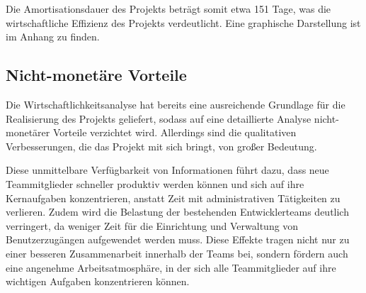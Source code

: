 Die Amortisationsdauer des Projekts beträgt somit etwa 151 Tage, was die wirtschaftliche Effizienz des Projekts verdeutlicht. Eine graphische Darstellung ist im Anhang  zu finden.

\subsection{Nicht-monetäre Vorteile}
\label{sec:Nutzwertanalyse}

Die Wirtschaftlichkeitsanalyse hat bereits eine ausreichende Grundlage für die Realisierung des Projekts geliefert, sodass auf eine detaillierte Analyse nicht-monetärer Vorteile verzichtet wird. Allerdings sind die qualitativen Verbesserungen, die das Projekt mit sich bringt, von großer Bedeutung.

Diese unmittelbare Verfügbarkeit von Informationen führt dazu, dass neue Teammitglieder schneller produktiv werden können und sich auf ihre Kernaufgaben konzentrieren, anstatt Zeit mit administrativen Tätigkeiten zu verlieren. Zudem wird die Belastung der bestehenden Entwicklerteams deutlich verringert, da weniger Zeit für die Einrichtung und Verwaltung von Benutzerzugängen aufgewendet werden muss. Diese Effekte tragen nicht nur zu einer besseren Zusammenarbeit innerhalb der Teams bei, sondern fördern auch eine angenehme Arbeitsatmosphäre, in der sich alle Teammitglieder auf ihre wichtigen Aufgaben konzentrieren können.

